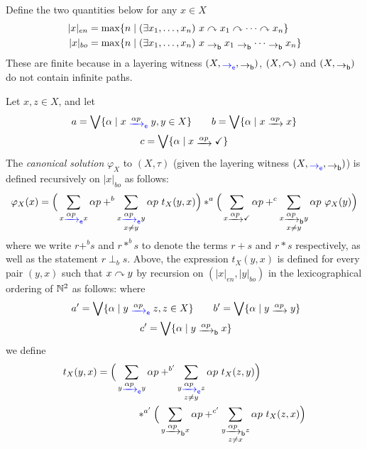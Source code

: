 \documentclass[orivec,envcountsect,envcountsame]{llncs}
\begin{document}
\begin{definition}\label{def:deterministic_canonical_solution}
	Define the two quantities below for any \(x \in X\)
	\begin{align*}
		|x|_{en} &= \max \{n \mid (\exists x_1,\dots,x_n)~x \diredge x_1 \diredge \cdots \diredge x_n\} \\
		|x|_{bo} &= \max \{n \mid (\exists x_1,\dots,x_n)~x \bo x_1 \bo \cdots \bo x_n\}
	\end{align*}
	These are finite because in a layering witness \((X,\eo, \bo)\), \((X,\mathrel{\curvearrowright})\) and \((X, \bo)\) do not contain infinite paths.

	Let \(x,z \in X\), and let
	\begin{equation}
		\label{eq:abc}
		\begin{gathered}
			a = \bigvee\{\alpha \mid x \etr{\alpha p} y,y \in X\}
			\qquad
			b = \bigvee\{\alpha \mid x \tr{\alpha p} x\}
			\\
			c = \bigvee\{\alpha \mid x \tr{\alpha p} \checkmark\}
		\end{gathered}
	\end{equation}
	The \emph{canonical solution} \(\varphi_X\) to \((X,\tau)\) (given the layering witness \((X,\eo, \bo)\)) is defined recursively on \(|x|_{bo}\) as follows:
	\[
		\varphi_X(x)
		= \Big(\sum_{x \etr{\alpha p} x} \alpha p +^b \sum_{\substack{x \etr{\alpha p} y\\x\neq y}} \alpha p~t_X(y,x)\Big) *^a \Big(\sum_{x \tr{\alpha p} \checkmark} \alpha p +^c \sum_{\substack{x \btr{\alpha p} y\\x\neq y}} \alpha p~\varphi_X(y)\Big)
	\]
	where we write \(r +^b s\) and \(r *^b s\) to denote the terms \(r + s\) and \(r * s\) respectively, as well as the statement \(r \perp_b s\).
	Above, the expression \(t_X(y,x)\) is defined for every pair \((y,x)\) such that \(x \mathrel{\curvearrowright} y\) by recursion on \((|x|_{en}, |y|_{bo})\) in the lexicographical ordering of \(\mathbb{N}^2\) as follows:
	where
	\begin{equation}\
		\label{eq:a'b'c'}
		\begin{gathered}
		a' = \bigvee \{\alpha\mid y \etr{\alpha p} z, z \in X\}
		\qquad
		b' = \bigvee \{\alpha \mid y \tr{\alpha p} y\}
		\\
		c' = \bigvee \{\alpha \mid y \btr{\alpha p} x\}
		\end{gathered}
	\end{equation}
	we define
	\begin{align*}
		t_X(y, x)
		&= \Big(\sum_{y \etr{\alpha p} y} \alpha p
		+^{b'} \sum_{\substack{y \etr{\alpha p} z\\z\neq y}} \alpha p~t_X(z,y)\Big)
		\\&\hspace{4em}*^{a'} \Big(\sum_{y \btr{\alpha p} x} \alpha p
		+^{c'} \sum_{\substack{y \btr{\alpha p} z\\z\neq x}} \alpha p~t_X(z, x)\Big)
	\end{align*}
\end{definition}
\end{document}
